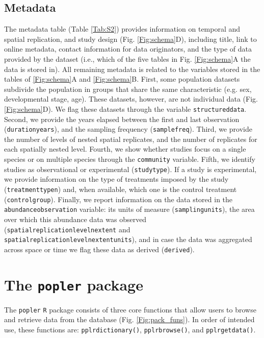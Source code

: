 \documentclass{article}\usepackage[]{graphicx}\usepackage[]{color}
\begin{document}
\subsection*{Metadata}
The metadata table (Table \ref{Tab:S2}) provides information on temporal and spatial replication, and study design (Fig. \ref{Fig:schema}D), including title, link to online metadata, contact information for data originators, and the type of data provided by the dataset (i.e., which of the five tables in Fig. \ref{Fig:schema}A the data is stored in). All remaining metadata is related to the variables stored in the tables of \ref{Fig:schema}A and \ref{Fig:schema}B. First, some population datasets subdivide the population in groups that share the same characteristic (e.g. sex, developmental stage, age). These datasets, however, are not individual data (Fig. \ref{Fig:schema}D). We flag these datasets through the variable \texttt{structured\textunderscore data}. Second, we provide the years elapsed between the first and last observation (\texttt{duration\textunderscore years}), and the sampling frequency (\texttt{samplefreq}). Third, we provide the number of levels of nested spatial replicates, and the number of replicates for each spatially nested level. Fourth, we show whether studies focus on a single species or on multiple species through the \texttt{community} variable. Fifth, we identify studies as observational or experimental (\texttt{studytype}). If a study is experimental, we provide information on the type of treatments imposed by the study (\texttt{treatment\textunderscore type\textunderscore n}) and, when available, which one is the control treatment (\texttt{control\textunderscore group}). Finally, we report information on the data stored in the \texttt{abundance\textunderscore observation} variable: its units of measure (\texttt{samplingunits}), the area over which this abundance data was observed\\ (\texttt{spatial\textunderscore replication\textunderscore level\textunderscore n\textunderscore extent} and\\ \texttt{spatial\textunderscore replication\textunderscore level\textunderscore n\textunderscore extent\textunderscore units}), and in case the data was aggregated across space or time we flag these data as derived (\texttt{derived}).

\section*{The \texttt{popler} package}
The \texttt{popler} \texttt{R} package consists of three core functions that allow users to browse and retrieve data from the database (Fig. \ref{Fig:pack_funs}). In order of intended use, these functions are: \texttt{pplr\textunderscore dictionary()}, \texttt{pplr\textunderscore browse()}, and \texttt{pplr\textunderscore getdata()}.
\end{document}
